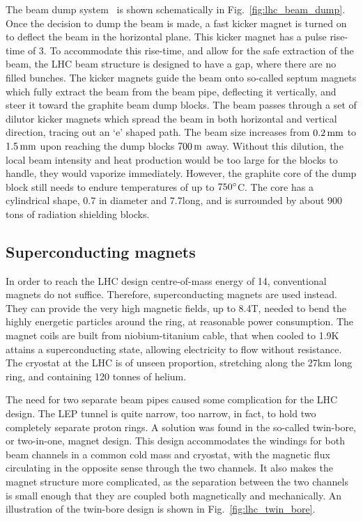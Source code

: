 The beam dump system~\cite{Schmidt:2006mi} is shown schematically in Fig.~\ref{fig:lhc_beam_dump}. 
Once the decision to dump the beam is made, a fast kicker magnet is turned on to deflect the beam
in the horizontal plane. 
This kicker magnet has a pulse rise-time of 3\mus. To accommodate this rise-time, and allow for
the safe extraction of the beam, the LHC beam structure is designed to have a gap, where there are
no filled bunches.
The kicker magnets guide the beam onto so-called septum magnets which fully extract the beam from
the beam pipe, deflecting it vertically, and steer it toward the graphite beam dump blocks. The
beam passes through a set of dilutor kicker magnets which spread the beam in both horizontal and
vertical direction, tracing out an `e' shaped path. 
The beam size increases from $0.2\mm$ to $1.5\mm$ upon reaching the dump blocks $700\meter$ away.
Without this dilution, the local beam intensity and heat production would be too large for the
blocks to handle, they would vaporize immediately. However, the graphite core of the dump block
still needs to endure temperatures of up to $750\de$C. The core has a cylindrical shape, 0.7\meter
in diameter and 7.7\meter long, and is surrounded by about 900 tons of radiation shielding blocks.


\subsection{Superconducting magnets}

In order to reach the LHC design centre-of-mass energy of 14\TeV, conventional magnets do not
suffice. Therefore, superconducting magnets are used instead. They can provide the very high
magnetic fields, up to 8.4\unit{T}, needed to bend the highly energetic
particles around the ring, at reasonable power consumption. The magnet coils are built from
niobium-titanium
cable, that when cooled to 1.9\unit{K} attains a superconducting state, allowing electricity to flow
without resistance. The cryostat at the LHC is of unseen proportion, stretching along the
27\unit{km} long ring, and containing 120 tonnes of helium.

The need for two separate beam pipes caused some complication for the LHC design. The LEP tunnel is
quite narrow, too narrow, in fact, to hold two completely separate proton rings. A solution was
found in the so-called twin-bore, or two-in-one, magnet design. This design accommodates the
windings for both beam channels in a common cold mass and cryostat, with the magnetic flux
circulating in the opposite sense through the two channels. 
It also makes the magnet structure more complicated, as the separation between the two channels is
small enough that they are coupled both magnetically and mechanically. An illustration of the
twin-bore design is shown in Fig.~\ref{fig:lhc_twin_bore}. 

